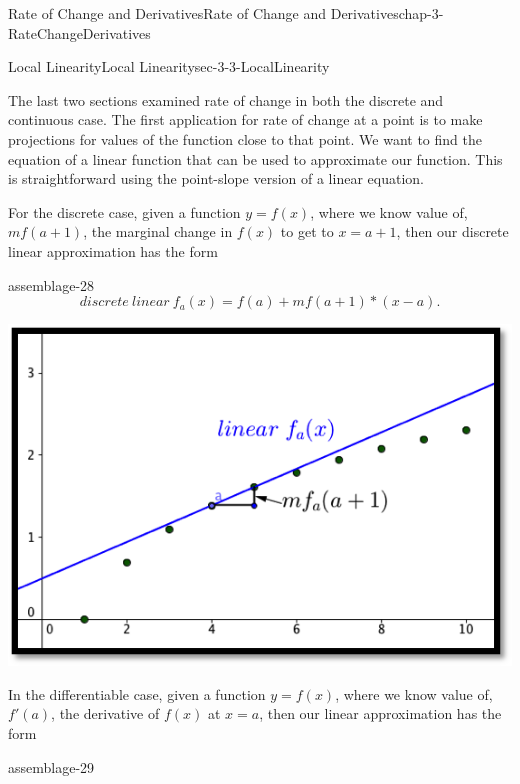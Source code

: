 \documentclass[oneside,10pt,]{book}
\numberwithin{equation}{section}
\begin{document}
\begin{chapterptx}{Rate of Change and Derivatives}{}{Rate of Change and Derivatives}{}{}{chap-3-RateChangeDerivatives}
\begin{sectionptx}{Local Linearity}{}{Local Linearity}{}{}{sec-3-3-LocalLinearity}
\par
\hypertarget{p-1132}{}%
The last two sections examined rate of change in both the discrete and continuous case.  The first application for rate of change at a point is to make projections for values of the function close to that point. We want to find the equation of a linear function that can be used to approximate our function.  This is straightforward using the point-slope version of a linear equation.%
\par
\hypertarget{p-1133}{}%
For the discrete case, given a function \(y=f(x)\), where we know value of, \(mf(a+1)\), the marginal change in \(f(x)\) to get to \(x=a+1\), then our discrete linear approximation has the form%
\begin{assemblage}{}{assemblage-28}%
\hypertarget{p-1134}{}%
%
\begin{equation*}
discrete\ linear\ f_a (x)=f(a)+mf(a+1)*(x-a).
\end{equation*}
%
\end{assemblage}
\begin{sidebyside}{1}{0.2}{0.2}{0}%
\begin{sbspanel}{0.6}%
\includegraphics[width=1\linewidth]{images/sec3-3-1.png}
\end{sbspanel}%
\end{sidebyside}%
\par
\hypertarget{p-1135}{}%
In the differentiable case, given a function \(y=f(x)\), where we know value of, \(f'(a)\), the derivative of \(f(x)\) at \(x=a\), then our linear approximation has the form%
\begin{assemblage}{}{assemblage-29}%
\hypertarget{p-1136}{}%
%
\begin{equation*}

\end{equation*}
\end{assemblage}
\end{sectionptx}
\end{chapterptx}
\end{document}
